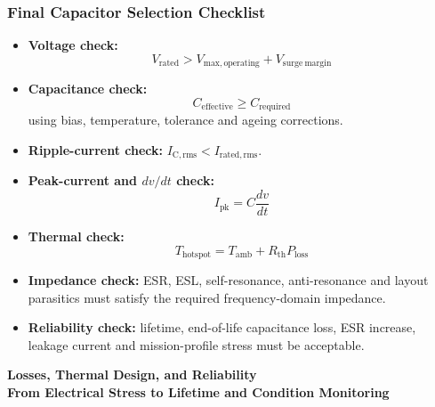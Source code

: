 \begin{frame}
\frametitle{Final Capacitor Selection Checklist}

\begin{itemize}
    \item \textbf{Voltage check:}
    \[
        V_{\mathrm{rated}} > V_{\mathrm{max,operating}} + V_{\mathrm{surge\ margin}}
    \]

    \item \textbf{Capacitance check:}
    \[
        C_{\mathrm{effective}} \geq C_{\mathrm{required}}
    \]
    using bias, temperature, tolerance and ageing corrections.

    \item \textbf{Ripple-current check:} $I_{\mathrm{C,rms}} < I_{\mathrm{rated,rms}}$.

    \item \textbf{Peak-current and \(dv/dt\) check:}
    \[
        I_{\mathrm{pk}} = C\frac{dv}{dt}
    \]

    \item \textbf{Thermal check:}
    \[
        T_{\mathrm{hotspot}} = T_{\mathrm{amb}} + R_{\mathrm{th}}P_{\mathrm{loss}}
    \]
    \item \textbf{Impedance check:}
    ESR, ESL, self-resonance, anti-resonance and layout parasitics must satisfy the required frequency-domain impedance.
    \item \textbf{Reliability check:}
    lifetime, end-of-life capacitance loss, ESR increase, leakage current and mission-profile stress must be acceptable.
\end{itemize}
\end{frame}


\begin{frame}
\begin{center}
  \textbf{\Huge{Losses, Thermal Design, and Reliability}}\\[0.4cm]
  \textbf{\Large{From Electrical Stress to Lifetime and Condition Monitoring}}
\end{center}
\end{frame}


